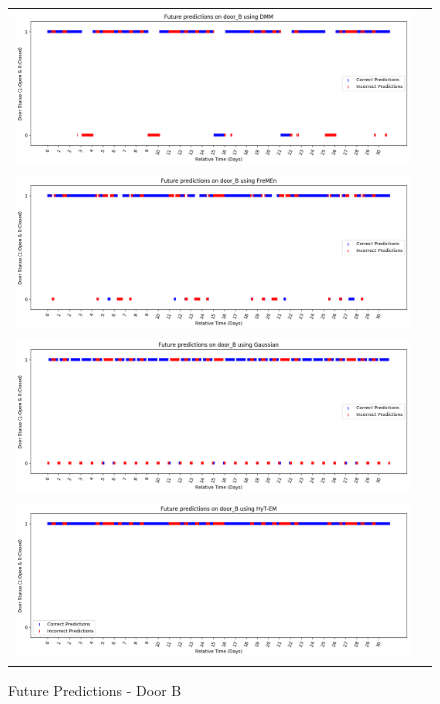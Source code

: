 \begin{center}
\begin{figure}[!Hp]
  \begin{tabular}{cc}
    {\includegraphics[width = 6in]{images/results/Future_door_B_DMM.png}} \\
    {\includegraphics[width = 6in]{images/results/Future_door_B_FreMEn.png}} \\
    {\includegraphics[width = 6in]{images/results/Future_door_B_Gaussian.png}} \\
    {\includegraphics[width = 6in]{images/results/Future_door_B_HyT-EM.png}} \\
  \end{tabular}
  \caption{Future Predictions - Door B}
\end{figure}\\ \\


\end{center}
